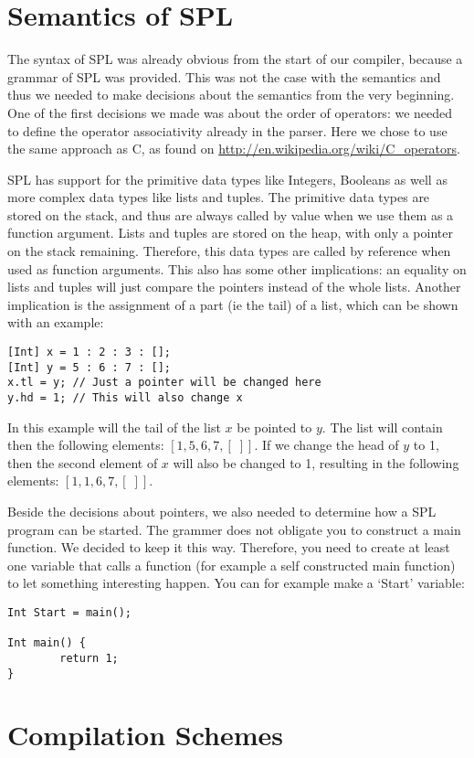 \documentclass[a4paper]{article}
\begin{document}
\section{Semantics of SPL}
The syntax of SPL was already obvious from the start of our compiler, because a grammar of SPL was provided. This was not the case with the semantics and thus we needed to make decisions about the semantics from the very beginning. One of the first decisions we made was about the order of operators: we needed to define the operator associativity already in the parser. Here we chose to use the same approach as C, as found on \url{http://en.wikipedia.org/wiki/C\_operators}. 

SPL has support for the primitive data types like Integers, Booleans as well as more complex data types like lists and tuples. The primitive data types are stored on the stack, and thus are always called by value when we use them as a function argument. Lists and tuples are stored on the heap, with only a pointer on the stack remaining. Therefore, this data types are called by reference when used as function arguments. This also has some other implications: an equality on lists and tuples will just compare the pointers instead of the whole lists. Another implication is the assignment of a part (ie the tail) of a list, which can be shown with an example:
\begin{verbatim}
[Int] x = 1 : 2 : 3 : [];
[Int] y = 5 : 6 : 7 : [];
x.tl = y; // Just a pointer will be changed here
y.hd = 1; // This will also change x
\end{verbatim}
In this example will the tail of the list $x$ be pointed to $y$. The list will contain then the following elements: $[1, 5, 6, 7, [\;]]$. If we change the head of $y$ to 1, then the second element of $x$ will also be changed to 1, resulting in the following elements: $[1, 1, 6, 7, [\;]]$.

Beside the decisions about pointers, we also needed to determine how a SPL program can be started. The grammer does not obligate you to construct a main function. We decided to keep it this way. Therefore, you need to create at least one variable that calls a function (for example a self constructed main function) to let something interesting happen. You can for example make a `Start' variable:
\begin{verbatim}
Int Start = main();

Int main() {
        return 1;
}
\end{verbatim}

\section{Compilation Schemes}
\end{document}
